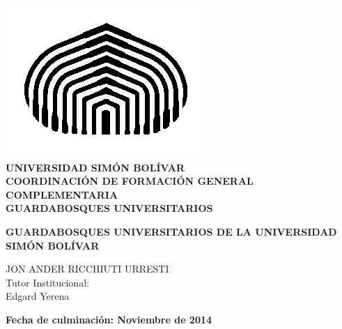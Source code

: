 \begin{titlepage}
\begin{center}

\includegraphics[scale=0.5,type=png,ext=.png,read=.png]{imagenes/cebolla} \\

\textsc {\bfseries UNIVERSIDAD SIMÓN BOLÍVAR} \\
\textsc{\bfseries COORDINACIÓN DE FORMACIÓN GENERAL COMPLEMENTARIA\\
GUARDABOSQUES UNIVERSITARIOS}

\bigskip
\bigskip
\bigskip
\bigskip
\bigskip
\bigskip
\bigskip
\bigskip
\bigskip
\bigskip
\bigskip
\bigskip
\bigskip
\bigskip
\bigskip
\bigskip
\bigskip
\bigskip

\textsc{\bfseries GUARDABOSQUES UNIVERSITARIOS DE LA UNIVERSIDAD SIMÓN BOLÍVAR}

\bigskip
\bigskip
\bigskip
\bigskip
\bigskip
\bigskip
\bigskip
\bigskip
\bigskip
\bigskip
\bigskip
\bigskip
\bigskip
\bigskip
\bigskip
\begin{minipage}{\textwidth}
\centering
JON ANDER RICCHIUTI URRESTI \\
Tutor Institucional: \\
Edgard Yerena 

\end{minipage}

\bigskip
\bigskip
\bigskip
\bigskip
\bigskip
\bigskip
\bigskip
\vfill

{\large \bfseries Fecha de culminación: Noviembre de 2014}

\end{center}
\end{titlepage}